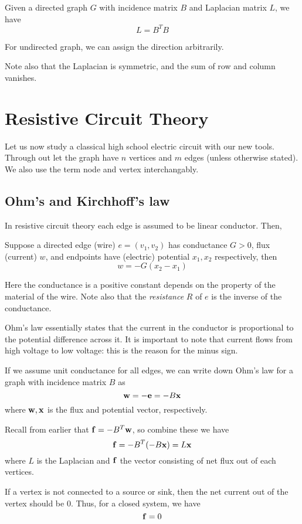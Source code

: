 \documentclass[11pt]{article}
\begin{document}
\begin{theorem}
  Given a directed graph \(G\) with incidence matrix \(B\) and Laplacian matrix \(L\), we have 
  \[L=B^TB\]
\end{theorem}
For undirected graph, we can assign the direction arbitrarily.

Note also that the Laplacian is symmetric, and the sum of row and column vanishes.

\section{Resistive Circuit Theory}
Let us now study a classical high school electric circuit with our new tools. Through out let the graph have \(n\) vertices and \(m\) edges (unless otherwise stated). We also use the term node and vertex interchangably.

\subsection{Ohm's and Kirchhoff's law}
In resistive circuit theory each edge is assumed to be linear conductor. Then,
\begin{theorem}
  Suppose a directed edge (wire) \(e=(v_1,v_2)\) has conductance \(G>0\), flux (current) \(w\), and endpoints have (electric) potential \(x_1,x_2\) respectively, then
  \[w=-G(x_2-x_1)\]
\end{theorem}
Here the conductance is a positive constant depends on the property of the material of the wire. Note also that the \emph{resistance} \(R\) of \(e\) is the inverse of the conductance.

Ohm's law essentially states that the current in the conductor is proportional to the potential difference across it. It is important to note that current flows from high voltage to low voltage: this is the reason for the minus sign.

If we assume unit conductance for all edges, we can write down Ohm's law for a graph with incidence matrix \(B\) as
\[\bf{w}=-\bf{e}=-B\bf{x}\]
where \(\bf{w},\bf{x}\) is the flux and potential vector, respectively.

Recall from earlier that \(\bf{f}=-B^T\bf{w}\), so combine these we have
\[\bf{f}=-B^T(-B\bf{x})=L\bf{x}\]
where \(L\) is the Laplacian and \(\bf{f}\) the vector consisting of net flux out of each vertices.

\begin{theorem}
  If a vertex is not connected to a source or sink, then the net current out of the vertex should be 0. Thus, for a closed system, we have
  \[\bf{f}=0\] 
\end{theorem}
\end{document}
